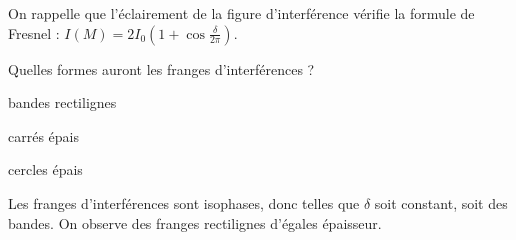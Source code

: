 


On rappelle que l'éclairement de la figure d'interférence vérifie la formule de Fresnel : $I\left(M\right)=2I_0 \left(1 + \cos \frac{\delta}{2\pi} \right)$.

\begin{enonce}
	 Quelles formes auront les franges d'interférences ?

	\begin{listeQCM3Colonnes}
	\item bandes rectilignes
	\item carrés épais
	\item cercles épais
	\end{listeQCM3Colonnes}

\end{enonce}

\reponse{\reponseA{}}

\begin{corrige}
	Les franges d'interférences sont isophases, donc telles que $\delta$ soit constant, soit des bandes. On observe des franges rectilignes d'égales épaisseur.
\end{corrige}

\finEntrainement

\afficheReponsesMelangees

\finFicheEntrainement                                                                        %

\ifdefined\mainIsLoaded\else
\printReponsesEtCorriges
\fi
